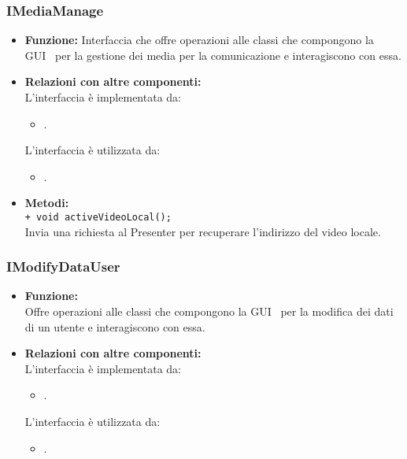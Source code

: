 {\begin{sloppypar}
{		\subsubsection{IMediaManage}\label{ssub:IMediaManage}{
		\begin{itemize}
			\item[]  \textbf{Funzione:}
				Interfaccia che offre operazioni alle classi che compongono la GUI\g~ per la 
				gestione dei media per la comunicazione e interagiscono con essa.\\
		
			\item[]  \textbf{Relazioni con altre componenti:} \\
				L'interfaccia è implementata da:
				\begin{itemize}
					\item[] .
				\end{itemize}
				L'interfaccia è utilizzata da:
				\begin{itemize}
					\item[] .\\
				\end{itemize}
					
			\item[]  \textbf{Metodi:}\\
				\texttt{+ void activeVideoLocal();}\\
				Invia una richiesta al Presenter per recuperare l'indirizzo del video locale.\\
		\end{itemize}		
		}
		
		
		\subsubsection{IModifyDataUser}\label{ssub:IModifyDataUser}{
		\begin{itemize}
			\item[] \textbf{Funzione:}\\
				  Offre operazioni alle classi che compongono la GUI\g~ per la modifica dei dati di un utente e interagiscono con essa.\\
				
			\item[] \textbf{Relazioni con altre componenti:}\\
				L'interfaccia è implementata da:
				\begin{itemize}
					\item[] . 
				\end{itemize}
				L'interfaccia è utilizzata da:
				\begin{itemize}
					\item[] . \\
				\end{itemize}
				

\end{itemize}}}
\end{sloppypar}}
